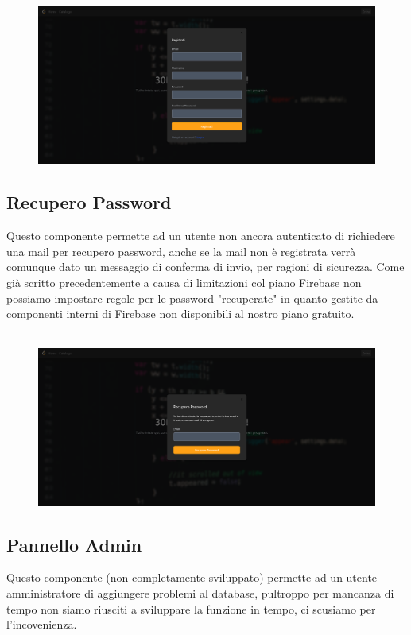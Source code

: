 \documentclass[11pt, a4paper]{article}
\theoremstyle{definition}
\begin{document}
\begin{figure}[H]
  \centering
  \includegraphics[width=\textwidth]{materiale/sito/Signup.png}
\end{figure}

\subsection{Recupero Password}
Questo componente permette ad un utente non ancora autenticato di richiedere una mail per recupero password, anche se la mail non è registrata verrà comunque dato un messaggio di conferma di invio, per ragioni di sicurezza. Come già scritto precedentemente
a causa di limitazioni col piano Firebase non possiamo impostare regole per le password "recuperate" in quanto gestite da componenti interni di Firebase non disponibili al nostro piano gratuito.\\\\

\begin{figure}[H]
  \centering
  \includegraphics[width=\textwidth]{materiale/sito/Recupero Pw.png}
\end{figure}

\subsection{Pannello Admin}
Questo componente (non completamente sviluppato) permette ad un utente amministratore di aggiungere problemi al database, pultroppo per mancanza di tempo non siamo riusciti a sviluppare la funzione in tempo, ci scusiamo per l'incovenienza.\\\\
\end{document}
